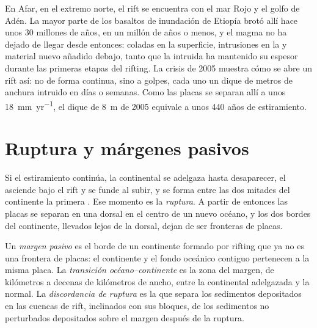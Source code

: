 En Afar, en el extremo norte, el rift se encuentra con el mar Rojo y el golfo de Adén. La mayor parte de los basaltos de inundación de
Etiopía brotó allí hace unos 30 millones de años, en un millón de años o menos, y el magma no ha dejado de llegar desde entonces: coladas
en la superficie, intrusiones en la  y material nuevo añadido debajo, tanto que la  intruida ha mantenido su espesor durante
las primeras etapas del rifting. La crisis de 2005 muestra cómo se abre un rift así: no de forma continua, sino a golpes, cada uno un dique
de metros de anchura intruido en días o semanas. Como las placas se separan allí a unos \qty{18}{mm.yr^{-1}}, el dique de \qty{8}{m} de 2005
equivale a unos 440 años de estiramiento.

\section{Ruptura y márgenes pasivos}

Si el estiramiento continúa, la  continental se adelgaza hasta desaparecer, el  asciende bajo el rift y se funde al subir, y se
forma entre las dos mitades del continente la primera . Ese momento es la \emph{ruptura}. A partir de entonces las placas
se separan en una dorsal en el centro de un nuevo océano, y los dos bordes del continente, llevados lejos de la dorsal, dejan de ser
fronteras de placas.

\begin{definition}\label{def:b1:rifts-ridges-margins:passive-margin}
Un \emph{margen pasivo} es el borde de un continente formado por rifting que ya no es una frontera de placas: el
continente y el fondo oceánico contiguo pertenecen a la misma placa. La \emph{transición océano--continente}
es la zona del margen, de kilómetros a decenas de kilómetros de ancho, entre la  continental adelgazada y la  normal.
La \emph{discordancia de ruptura} es la  que separa los sedimentos depositados en las cuencas de
rift, inclinados con sus bloques, de los sedimentos no perturbados depositados sobre el margen después de la ruptura.
\end{definition}

